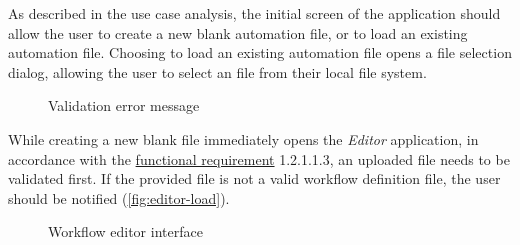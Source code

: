 As described in the use case analysis, the initial screen of the application should allow the user to create a new blank automation file, or to load an existing automation file.
Choosing to load an existing automation file opens a file selection dialog, allowing the user to select an file from their local file system.

\begin{figure}[!h]
    \begin{center}
    \end{center}
    \caption{Validation error message}\label{fig:editor-load}
\end{figure}
While creating a new blank file immediately opens the \textit{Editor} application, in accordance with the \hyperref[requirements]{functional requirement} 1.2.1.1.3, an uploaded file needs to be validated first.
If the provided file is not a valid workflow definition file, the user should be notified (\autoref{fig:editor-load}).

\begin{figure}[h!]
    \begin{center}
    \end{center}
    \caption{Workflow editor interface} \label{fig:editor-workflow}
\end{figure}

